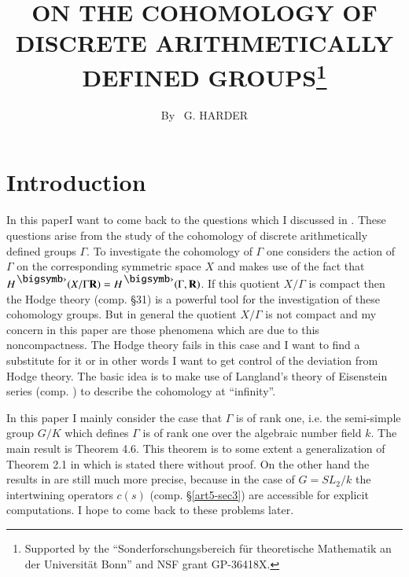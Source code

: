 
\title{ON THE COHOMOLOGY OF DISCRETE ARITHMETICALLY DEFINED GROUPS\footnote{Supported by the ``Sonderforschungsbereich f\"ur theoretische Mathematik an der Universit\"at Bonn'' and NSF grant GP-36418X.}}

\author{By~ G. HARDER} 

\date{}
\maketitle


\setcounter{page}{135}
\setcounter{pageoriginal}{128}

\section*{Introduction}
In this paper\pageoriginale I want to come back to the questions which I discussed in \cite{art5-key7}. These questions arise from the study of the cohomology of discrete arithmetically defined groups $\Gamma$. To investigate the cohomology of $\Gamma$ one considers the action of $\Gamma$ on the corresponding symmetric space $X$ and makes use of the fact that $H^\bigdot (X / \Gamma \bR) = H^\bigdot (\Gamma, \bR)$. If this quotient $X / \Gamma$ is compact then the Hodge theory (comp. \cite{art5-key12} \S 31) is a powerful tool for the investigation of these cohomology groups. But in general the quotient $X/ \Gamma$ is not compact and my concern in this paper are those phenomena which are due to this noncompactness. The Hodge theory fails in this case and I want to find a substitute for it or in other words I want to get control of the deviation from Hodge theory. The basic idea is to make use of Langland's theory of Eisenstein series (comp. \cite{art5-key8}) to describe the cohomology at ``infinity''.

In this paper I mainly consider the case that $\Gamma$ is of rank one, i.e. the semi-simple group $G/ K$ which defines $\Gamma$ is of rank one over the algebraic number field $k$. The main result is Theorem 4.6. This theorem is to some extent a generalization of Theorem 2.1 in \cite{art5-key7} which is stated there without proof. On the other hand the results in \cite{art5-key7} are still much more precise, because in the case of $G = S L_2 / k$ the intertwining operators $c (s)$ (comp. \S \ref{art5-sec3}) are accessible for explicit computations. I hope to come back to these problems later.

